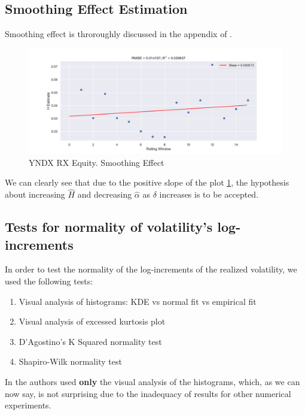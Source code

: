     \subsection{Smoothing Effect Estimation}
        Smoothing effect is throroughly discussed in the appendix of \cite{GatheralRosenbaum2014}.

        \begin{figure}[htbp]
            \includegraphics[width=\textwidth]{fig/YNDX RX Equity Smoothing Effect.pdf}
            \caption{YNDX RX Equity. Smoothing Effect}
            \label{fig:smooth}
        \end{figure}

        We can clearly see that due to the positive slope of the plot \ref{fig:smooth}, the hypothesis about increasing $\hat{H}$ and decreasing $\hat{\alpha}$ as $\delta$ increases is to be accepted.

    \subsection{Tests for normality of volatility's log-increments}
        In order to test the normality of the log-increments of the realized volatility, we used the following tests:
        \begin{enumerate}
            \item Visual analysis of histograms: KDE vs normal fit vs empirical fit
            \item Visual analysis of excessed kurtosis plot
            \item D'Agostino's K Squared normality test
            \item Shapiro-Wilk normality test
        \end{enumerate}

        In \cite{GatheralRosenbaum2014} the authors used \textbf{only} the visual analysis of the 
        histograms, which, as we can now say, is not surprising due to the inadequacy of results 
        for other numerical experiments.

